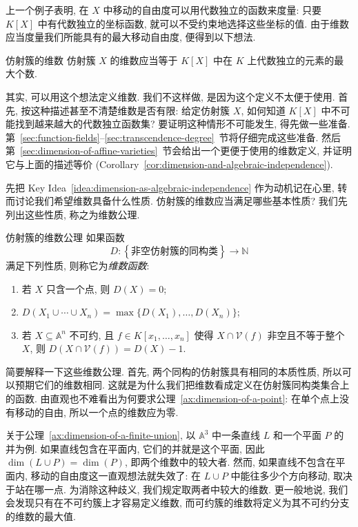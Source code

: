 上一个例子表明, 在 $X$ 中\textquotedbl{}移动的自由度\textquotedbl{}可以用代数独立的函数来度量: 只要 $K[X]$ 中有代数独立的坐标函数, 就可以不受约束地选择这些坐标的值. 由于维数应当度量我们所能具有的最大移动自由度, 便得到以下想法.

\begin{BookKeyIdea}{仿射簇的维数}\leavevmode\label{idea:dimension-as-algebraic-independence}
仿射簇 $X$ 的维数应当等于 $K[X]$ 中在 $K$ 上代数独立的元素的最大个数.
\end{BookKeyIdea}

其实, 可以用这个想法定义维数. 我们不这样做, 是因为这个定义不太便于使用. 首先, 按这种描述甚至不清楚维数是否有限: 给定仿射簇 $X$, 如何知道 $K[X]$ 中不可能找到越来越大的代数独立函数集? 要证明这种情形不可能发生, 得先做一些准备. 第~\ref{sec:function-fields}--\ref{sec:transcendence-degree}~节将仔细完成这些准备. 然后第~\ref{sec:dimension-of-affine-varieties}~节会给出一个更便于使用的维数定义, 并证明它与上面的描述等价 (Corollary~\ref{cor:dimension-and-algebraic-independence}).

先把 Key Idea~\ref{idea:dimension-as-algebraic-independence} 作为动机记在心里, 转而讨论我们希望维数具备什么性质. 仿射簇的维数应当满足哪些基本性质? 我们先列出这些性质, 称之为维数公理.

\begin{Definition}{仿射簇的维数公理}\leavevmode\label{def:axioms-for-dimension}
如果函数
\[
  D:\left\{\text{非空仿射簇的同构类}\right\}\longrightarrow\mathbb{N}
\]
满足下列性质, 则称它为\emph{维数函数}:
\begin{enumerate}
  \item\label{ax:dimension-of-a-point} 若 $X$ 只含一个点, 则 $D(X)=0$;
  \item\label{ax:dimension-of-a-finite-union} $D(X_{1}\cup\cdots\cup X_{n})=\max\{D(X_{1}),\ldots,D(X_{n})\}$;
  \item\label{ax:dimension-of-a-hypersurface-section} 若 $X\subseteq\mathbb{A}^{n}$ 不可约, 且 $f\in K[x_{1},\ldots,x_{n}]$ 使得 $X\cap\mathcal{V}(f)$ 非空且不等于整个 $X$, 则 $D(X\cap\mathcal{V}(f))=D(X)-1$.
\end{enumerate}
\end{Definition}

简要解释一下这些维数公理. 首先, 两个同构的仿射簇具有相同的本质性质, 所以可以预期它们的维数相同. 这就是为什么我们把维数看成定义在仿射簇同构类集合上的函数. 由直观也不难看出为何要求公理~\ref{ax:dimension-of-a-point}: 在单个点上没有移动的自由, 所以一个点的维数应为零.

关于公理~\ref{ax:dimension-of-a-finite-union}, 以 $\mathbb{A}^{3}$ 中一条直线 $L$ 和一个平面 $P$ 的并为例. 如果直线包含在平面内, 它们的并就是这个平面, 因此 $\dim(L\cup P)=\dim(P)$, 即两个维数中的较大者. 然而, 如果直线不包含在平面内, \textquotedbl{}移动的自由度\textquotedbl{}这一直观想法就失效了: 在 $L\cup P$ 中能往多少个方向移动, 取决于站在哪一点. 为消除这种歧义, 我们规定取两者中较大的维数. 更一般地说, 我们会发现只有在不可约簇上才容易定义维数, 而可约簇的维数将定义为其不可约分支的维数的最大值.

